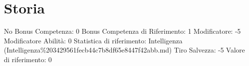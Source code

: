 \section{Storia}\label{storia}

\begin{description}
\tightlist
\item[Tags: ABI]
No Bonus Competenza: 0 Bonus Competenza di Riferimento: 1 Modificatore:
-5 Modificatore Abilità: 0 Statistica di riferimento: Intelligenza
(Intelligenza\%203429561fecb44c7b8df65e8447f42abb.md) Tiro Salvezza: -5
Valore di riferimento: 0
\end{description}
